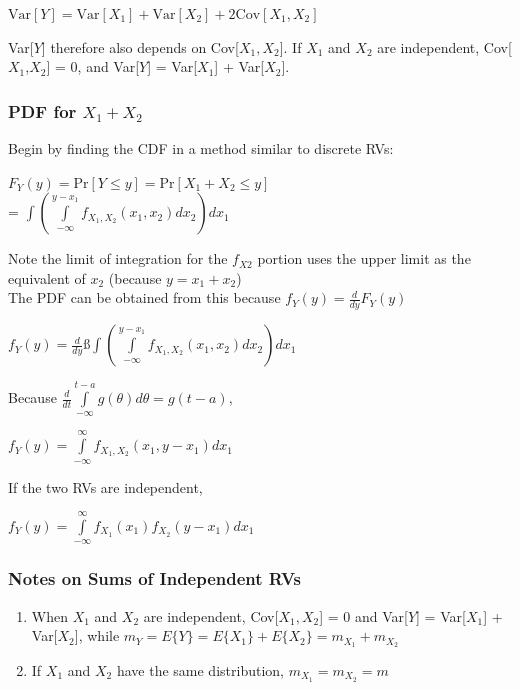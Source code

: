 \documentclass[11pt]{article}
\begin{document}
\begin{center}
    $ \text{Var}[Y] = \text{Var}[X_1] + \text{Var}[X_2] + 2\text{Cov}[X_1,X_2]$
\end{center}

Var[$Y$] therefore also depends on Cov[$X_1,X_2$]. If $X_1$ and $X_2$ are independent, Cov[$X_1$,$X_2$] = 0, and Var[$Y$] = Var[$X_1$] + Var[$X_2$]. 

\subsubsection{PDF for $X_1 + X_2$}

Begin by finding the CDF in a method similar to discrete RVs:
\begin{center}
    $F_Y(y) = \text{Pr}[Y \leq y] = \text{Pr}[X_1 + X_2 \leq y]$ \\ 
    = $\int (\int\limits^{y-x_1}_{-\infty}f_{X_1,X_2}(x_1,x_2)dx_2)dx_1$
\end{center}

Note the limit of integration for the $f_{X2}$ portion uses the upper limit as the equivalent of $x_2$ (because $y = x_1 + x_2$) \\ 

The PDF can be obtained from this because $f_Y(y) = \frac{d}{dy}F_Y(y)$

\begin{center}
    $f_Y(y) = \frac{d}{dy} ß\int (\int\limits^{y-x_1}_{-\infty}f_{X_1,X_2}(x_1,x_2)dx_2)dx_1$
\end{center}

Because $\frac{d}{dt}\int\limits_{-\infty}^{t-a}g(\theta)d\theta = g(t-a)$, \\

\begin{center}
    $f_Y(y) = \int\limits_{-\infty}^{\infty}f_{X_1,X_2}(x_1,y-x_1)dx_1$
\end{center}

If the two RVs are independent,

\begin{center}
    $f_Y(y) = \int\limits^{\infty}_{-\infty}f_{X_1}(x_1)f_{X_2}(y-x_1)dx_1$
\end{center}

\subsubsection{Notes on Sums of Independent RVs}

\begin{enumerate}
    \item When $X_1$ and $X_2$ are independent, Cov[$X_1,X_2$] = 0 and Var[$Y$] = Var[$X_1$] + Var[$X_2$], while $m_Y = E\{Y\} = E\{X_1\} + E\{X_2\} = m_{X_1} + m_{X_2}$
    \item If $X_1$ and $X_2$ have the same distribution, $m_{X_1} = m_{X_2} = m$
\end{enumerate}
\end{document}
